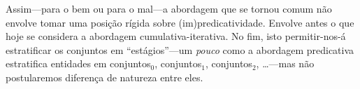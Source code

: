 \documentclass[../../../include/open-logic-section]{subfiles}
\begin{document}
Assim---para o bem ou para o mal---a abordagem que se tornou comum não
envolve tomar uma posição rígida sobre (im)\-pre\-di\-ca\-ti\-vi\-da\-de.
Envolve antes o que hoje se considera a abordagem
cumulativa-iterativa. No fim, isto permitir-nos-á estratificar os conjuntos em
``estágios''---um \emph{pouco} como a abordagem predicativa estratifica
entidades em conjuntos$_0$, conjuntos$_1$, conjuntos$_2$, \ldots---mas não
postularemos diferença de natureza entre eles. 
\end{document}
